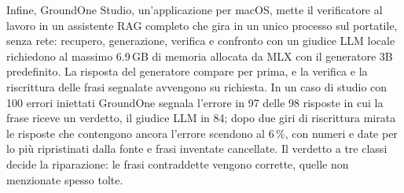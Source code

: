 Infine, GroundOne Studio, un'applicazione per macOS, mette il verificatore al lavoro in un assistente RAG completo che
gira in un unico processo sul portatile, senza rete: recupero, generazione, verifica e confronto con un giudice LLM locale richiedono al massimo 6.9\,GB di memoria allocata da MLX con il generatore 3B predefinito. La risposta del generatore compare per prima, e la verifica e la riscrittura delle
frasi segnalate avvengono su richiesta. In un caso di studio con 100 errori iniettati GroundOne segnala l'errore in 97 delle 98 risposte in cui la frase riceve un verdetto, il giudice LLM in 84; dopo due giri di riscrittura mirata le risposte che contengono ancora l'errore scendono al 6\,\%, con numeri e date per lo più ripristinati dalla fonte e frasi inventate cancellate. Il verdetto a tre classi decide la riparazione: le frasi contraddette vengono corrette, quelle non menzionate spesso tolte.
